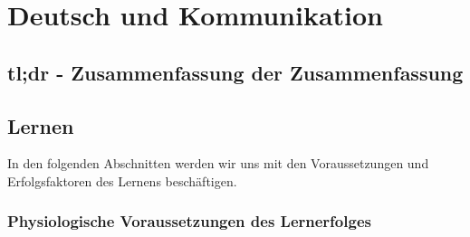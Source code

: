 \section{Deutsch und Kommunikation}


\subsection{tl;dr - Zusammenfassung der Zusammenfassung}


\subsection{Lernen}

In den folgenden Abschnitten werden wir uns mit den Voraussetzungen und Erfolgsfaktoren des Lernens beschäftigen.

\subsubsection{Physiologische Voraussetzungen des Lernerfolges}

